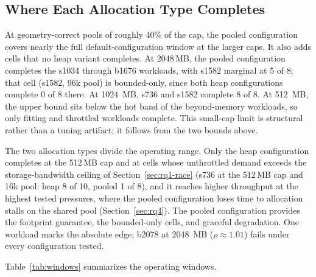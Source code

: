 \FloatBarrier
\subsection{Where Each Allocation Type Completes\label{sec:rq1-division}}

At geometry-correct pools of roughly 40\% of the cap, the pooled configuration covers nearly the full default-configuration window at the larger caps.
It also adds cells that no heap variant completes.
At 2048\,MB, the pooled configuration completes the s1034 through b1676 workloads, with s1582 marginal at 5 of 8; that cell (s1582, 96k pool) is bounded-only, since both heap configurations complete 0 of 8 there.
At 1024\, MB, s736 and s1582 complete 8 of 8.
At 512\, MB, the upper bound sits below the hot band of the beyond-memory workloads, so only fitting and throttled workloads complete.
This small-cap limit is structural rather than a tuning artifact; it follows from the two bounds above.

The two allocation types divide the operating range.
Only the heap configuration completes at the 512\,MB cap and at cells whose unthrottled demand exceeds the storage-bandwidth ceiling of Section~\ref{sec:rq1-race} (s736 at the 512\,MB cap and 16k pool: heap 8 of 10, pooled 1 of 8), and it reaches higher throughput at the highest tested pressures, where the pooled configuration loses time to allocation stalls on the shared pool (Section~\ref{sec:rq4}).
The pooled configuration provides the footprint guarantee, the bounded-only cells, and graceful degradation.
One workload marks the absolute edge; b2078 at 2048\, MB ($\rho \approx 1.01$) fails under every configuration tested.

Table~\ref{tab:windows} summarizes the operating windows.

